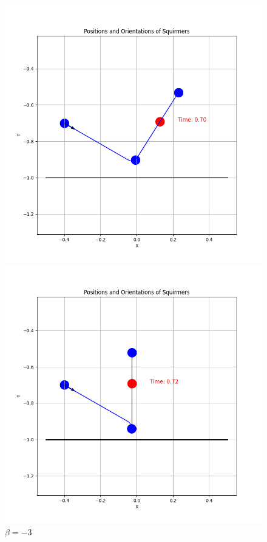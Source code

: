 \documentclass{article}
\begin{document}
\begin{figure}[H]
    \centering
    \begin{minipage}{0.49\textwidth}
        \includegraphics[width=1.1\textwidth]{graphs/simulations/border/betam1_5/mpi_6.png}
        \caption{\footnotesize $\beta = -1.5$}
    \end{minipage}\hfill
    \begin{minipage}{0.49\textwidth}
        \includegraphics[width=1.1\textwidth]{graphs/simulations/border/betam3/mpi_6.png}
        \caption{\footnotesize $\beta = -3$}
    \end{minipage}
\end{figure}
\end{document}
